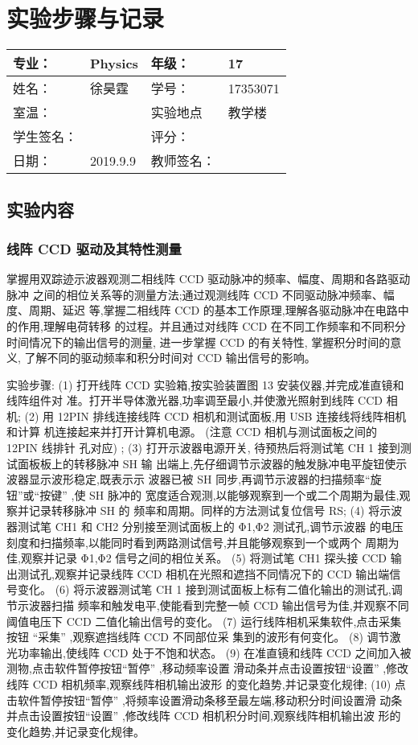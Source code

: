 \documentclass{ctexart}
\begin{document}
\newpage
\section{实验步骤与记录}
\begin{tabular}{|p{8em}|p{8em}|p{8em}|p{8em}|}
	\hline 
	专业：     &Physics       &年级：      & 17     \\
	\hline
	姓名：& 徐昊霆 &学号：&17353071  \\
	\hline
	室温：&                    &实验地点 & 教学楼 \\
	\hline	
	学生签名： & & 评分： & \\
	\hline
	日期： & 2019.9.9 & 教师签名：&  \\
	\hline
\end{tabular}
\subsection{实验内容}
\subsubsection{线阵 CCD 驱动及其特性测量}
掌握用双踪迹示波器观测二相线阵 CCD 驱动脉冲的频率、幅度、周期和各路驱动脉冲
之间的相位关系等的测量方法;通过观测线阵 CCD 不同驱动脉冲频率、幅度、周期、延迟
等,掌握二相线阵 CCD 的基本工作原理,理解各驱动脉冲在电路中的作用,理解电荷转移
的过程。并且通过对线阵 CCD 在不同工作频率和不同积分时间情况下的输出信号的测量,
进一步掌握 CCD 的有关特性,
掌握积分时间的意义,
了解不同的驱动频率和积分时间对 CCD
输出信号的影响。

实验步骤:
(1) 打开线阵 CCD 实验箱,按实验装置图 13 安装仪器,并完成准直镜和线阵组件对
准。打开半导体激光器,功率调至最小,并使激光照射到线阵 CCD 相机;
(2) 用 12PIN 排线连接线阵 CCD 相机和测试面板,用 USB 连接线将线阵相机和计算
机连接起来并打开计算机电源。
(注意 CCD 相机与测试面板之间的 12PIN 线排针
孔对应)
;
(3) 打开示波器电源开关,
待预热后将测试笔 CH 1 接到测试面板板上的转移脉冲 SH 输
出端上,先仔细调节示波器的触发脉冲电平旋钮使示波器显示波形稳定,既表示示
波器已被 SH 同步,再调节示波器的扫描频率“旋钮”或“按键”
,使 SH 脉冲的
宽度适合观测,以能够观察到一个或二个周期为最佳,观察并记录转移脉冲 SH 的
频率和周期。同样的方法测试复位信号 RS;
(4) 将示波器测试笔 CH1 和 CH2 分别接至测试面板上的 Φ1,Φ2 测试孔,调节示波器
的电压刻度和扫描频率,以能同时看到两路测试信号,并且能够观察到一个或两个
周期为佳,观察并记录 Φ1,Φ2 信号之间的相位关系。
(5) 将测试笔 CH1 探头接 CCD 输出测试孔,观察并记录线阵 CCD 相机在光照和遮挡不同情况下的 CCD 输出端信号变化。
(6) 将示波器测试笔 CH 1 接到测试面板上标有二值化输出的测试孔,调节示波器扫描
频率和触发电平,使能看到完整一帧 CCD 输出信号为佳,并观察不同阈值电压下
CCD 二值化输出信号的变化。
(7) 运行线阵相机采集软件,点击采集按钮 “采集”
,观察遮挡线阵 CCD 不同部位采
集到的波形有何变化。
(8) 调节激光功率输出,使线阵 CCD 处于不饱和状态。
(9) 在准直镜和线阵 CCD 之间加入被测物,点击软件暂停按钮“暂停”
,移动频率设置
滑动条并点击设置按钮“设置”
,修改线阵 CCD 相机频率,观察线阵相机输出波形
的变化趋势,并记录变化规律;
(10) 点击软件暂停按钮“暂停”
,将频率设置滑动条移至最左端,移动积分时间设置滑
动条并点击设置按钮“设置”
,修改线阵 CCD 相机积分时间,观察线阵相机输出波
形的变化趋势,并记录变化规律。
\end{document}
